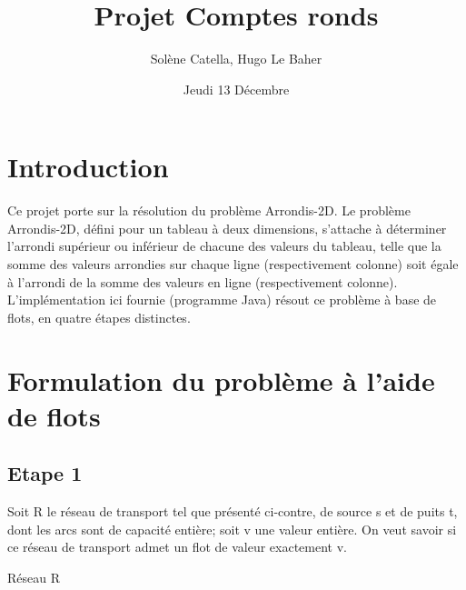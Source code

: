 \documentclass[letterpaper,12pt]{article}
\begin{document}
\title{Projet Comptes ronds}
\author{Solène Catella, Hugo Le Baher}
\date{Jeudi 13 Décembre}
\maketitle

\section{Introduction}

Ce projet porte sur la résolution du problème Arrondis-2D. Le problème Arrondis-2D, défini pour un tableau à deux dimensions, s'attache à déterminer l'arrondi supérieur ou inférieur de chacune des valeurs du tableau, telle que la somme des valeurs arrondies sur chaque ligne (respectivement colonne) soit égale à l'arrondi de la somme des valeurs en ligne (respectivement colonne). L'implémentation ici fournie (programme Java) résout ce problème à base de flots, en quatre étapes distinctes.

\section{Formulation du problème à l'aide de flots}

\subsection{Etape 1}

Soit R le réseau de transport tel que présenté ci-contre, de source s et de puits t, dont les arcs sont de capacité entière; soit v une valeur entière. On veut savoir si ce réseau de transport admet un flot de valeur exactement v.
\hfill \break

\begin{center}

Réseau R

\end{center}
\end{document}
